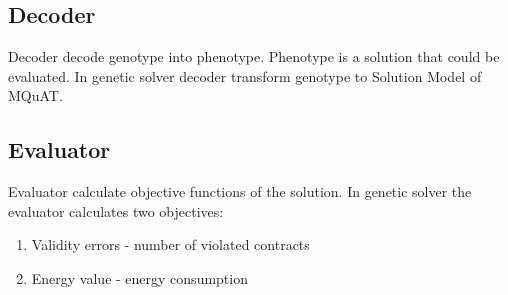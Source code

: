 
\subsection{Decoder}

Decoder decode genotype into phenotype.
Phenotype is a solution that could be evaluated.
In genetic solver decoder transform genotype to Solution Model of MQuAT.


\subsection{Evaluator}

Evaluator calculate objective functions of the solution. 
In genetic solver the evaluator calculates two  objectives:

\begin{enumerate}
	\item Validity errors - number of violated contracts
	\item Energy value - energy consumption
\end{enumerate}









